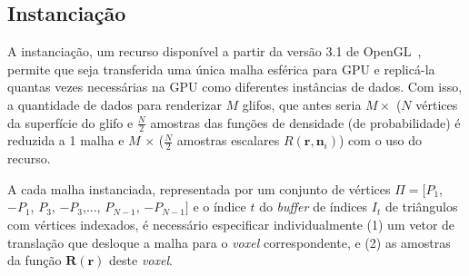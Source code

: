 



\subsection{Instanciação}
\label{ssec::atributos}

A instanciação, um recurso disponível a partir da versão 3.1 de OpenGL~\cite{segal2009}, permite que seja transferida uma única malha esférica para GPU e replicá-la quantas vezes necessárias na GPU como diferentes instâncias de dados. Com isso, a quantidade de dados para renderizar $M$ glifos, que antes seria $M \times$ ($N$ vértices da superfície do glifo e $\frac{N}{2}$ amostras das funções de densidade (de probabilidade) é reduzida a 1 malha e $M$ $\times$ ($\frac{N}{2}$ amostras escalares $R(\mathbf{r}, \mathbf{n}_i)$) com o uso do recurso.%

A cada malha instanciada, representada por um conjunto de vértices $\Pi = [
  P_1$,
$-P_1$,
$ P_3$,
$-P_3$,...,
$ P_{N-1}$,
$-P_{N-1}]$ e o índice $t$ do \textit{buffer} de índices $I_t$ de triângulos com vértices indexados, é necessário especificar individualmente (1) um vetor de translação que desloque a malha para o \textit{voxel} correspondente, e (2) as amostras da função $\boldsymbol{R}(\mathbf{r})$ deste \textit{voxel}.


